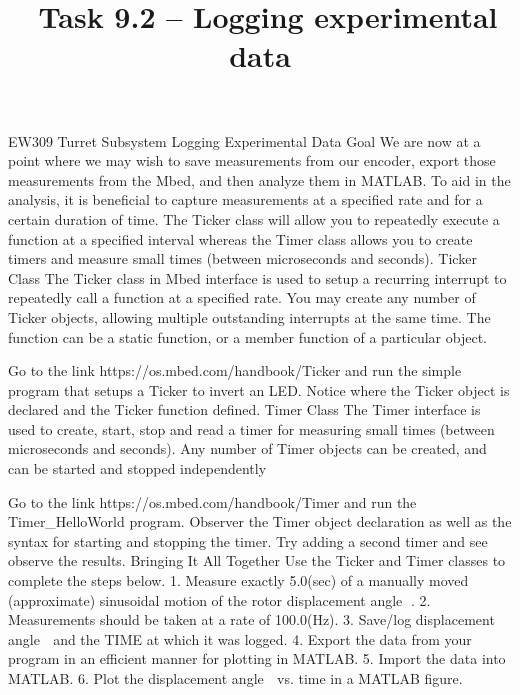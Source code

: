 \documentclass{tufte-handout}
\title{\usnaCourseNumber\ Task 9.2 -- Logging experimental data}
\author{\usnaInstructorShort}
\date{\printdate{\courseWeekSeven}}
\begin{document}
\maketitle
EW309 Turret Subsystem 
Logging Experimental Data
Goal
We are now at a point where we may wish to save measurements from our encoder, export those measurements from the Mbed, and then analyze them in MATLAB.  To aid in the analysis, it is beneficial to capture measurements at a specified rate and for a certain duration of time.  The Ticker class will allow you to repeatedly execute a function at a specified interval whereas the Timer class allows you to create timers and measure small times (between microseconds and seconds).                                    
Ticker Class
The Ticker class in Mbed interface is used to setup a recurring interrupt to repeatedly call a function at a specified rate. You may create any number of Ticker objects, allowing multiple outstanding interrupts at the same time. The function can be a static function, or a member function of a particular object.

Go to the link https://os.mbed.com/handbook/Ticker and run the simple program that setups a Ticker to invert an LED.  Notice where the Ticker object is declared and the Ticker function defined.  
Timer Class
The Timer interface is used to create, start, stop and read a timer for measuring small times (between microseconds and seconds). Any number of Timer objects can be created, and can be started and stopped independently

Go to the link https://os.mbed.com/handbook/Timer and run the Timer_HelloWorld program.  Observer the Timer object declaration as well as the syntax for starting and stopping the timer.  Try adding a second timer and see observe the results.
Bringing It All Together
Use the Ticker and Timer classes to complete the steps below.
    1. Measure exactly 5.0(sec) of a manually moved (approximate) sinusoidal motion of the rotor displacement angle .
    2. Measurements should be taken at a rate of 100.0(Hz). 
    3. Save/log displacement angle  and the TIME at which it was logged. 
    4. Export the data from your program in an efficient manner for plotting in MATLAB. 
    5. Import the data into MATLAB. 
    6. Plot the displacement angle  vs. time in a MATLAB figure. 
\end{document}
